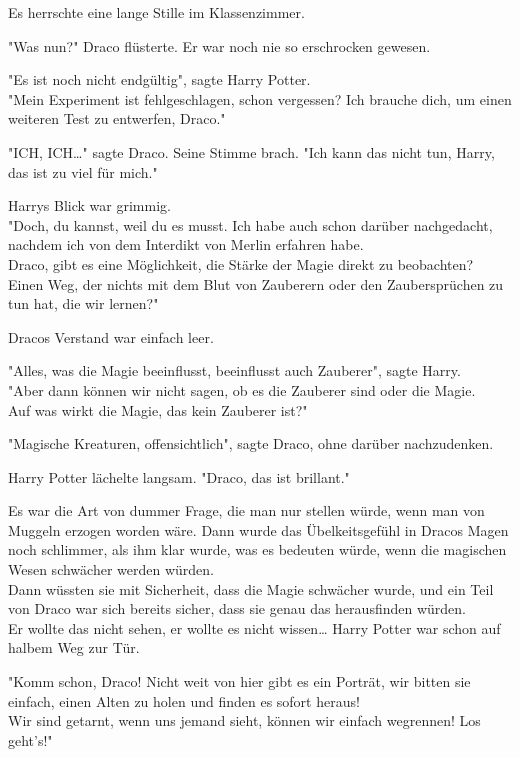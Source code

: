 {Es herrschte eine lange Stille im Klassenzimmer.

"Was nun?" Draco flüsterte. Er war noch nie so erschrocken gewesen.

"Es ist noch nicht endgültig", sagte Harry Potter.\\ "Mein Experiment ist fehlgeschlagen, schon vergessen? Ich brauche dich, um einen weiteren Test zu entwerfen, Draco."

"ICH, ICH…" sagte Draco. Seine Stimme brach. "Ich kann das nicht tun, Harry, das ist zu viel für mich."

Harrys Blick war grimmig.\\ "Doch, du kannst, weil du es musst. Ich habe auch schon darüber nachgedacht, nachdem ich von dem Interdikt von Merlin erfahren habe.\\ Draco, gibt es eine Möglichkeit, die Stärke der Magie direkt zu beobachten? Einen Weg, der nichts mit dem Blut von Zauberern oder den Zaubersprüchen zu tun hat, die wir lernen?"

Dracos Verstand war einfach leer.

"Alles, was die Magie beeinflusst, beeinflusst auch Zauberer", sagte Harry.\\ "Aber dann können wir nicht sagen, ob es die Zauberer sind oder die Magie.\\ Auf was wirkt die Magie, das kein Zauberer ist?"

"Magische Kreaturen, offensichtlich", sagte Draco, ohne darüber nachzudenken.

Harry Potter lächelte langsam. "Draco, das ist brillant."

Es war die Art von dummer Frage, die man nur stellen würde, wenn man von Muggeln erzogen worden wäre. Dann wurde das Übelkeitsgefühl in Dracos Magen noch schlimmer, als ihm klar wurde, was es bedeuten würde, wenn die magischen Wesen schwächer werden würden.\\ Dann wüssten sie mit Sicherheit, dass die Magie schwächer wurde, und ein Teil von Draco war sich bereits sicher, dass sie genau das herausfinden würden.\\ Er wollte das nicht sehen, er wollte es nicht wissen… Harry Potter war schon auf halbem Weg zur Tür.

"Komm schon, Draco! Nicht weit von hier gibt es ein Porträt, wir bitten sie einfach, einen Alten zu holen und finden es sofort heraus!\\ Wir sind getarnt, wenn uns jemand sieht, können wir einfach wegrennen! Los geht's!"

}
